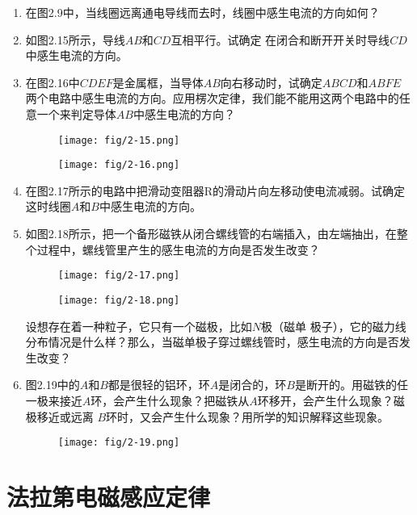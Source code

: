 \begin{enumerate}
    \item 在图2.9中，当线圈远离通电导线而去时，线圈中感生电流的方向如何？
    \item 如图2.15所示，导线$AB$和$CD$互相平行。试确定
    在闭合和断开开关时导线$CD$中感生电流的方向。
  \item 在图2.16中$CDEF$是金属框，当导体$AB$向右移动时，试确定$ABCD$和$ABFE$ 两个电路中感生电流的方向。应用楞次定律，我们能不能用这两个电路中的任意一个来判定导体$AB$中感生电流的方向？
  \begin{figure}[htp]
\centering
\begin{minipage}[t]{0.48\textwidth}
\centering
\texttt{[image: fig/2-15.png]}
\caption{}
\end{minipage}
\begin{minipage}[t]{0.48\textwidth}
\centering
\texttt{[image: fig/2-16.png]}
\caption{}
\end{minipage}
\end{figure}
  \item 在图2.17所示的电路中把滑动变阻器R的滑动片向左移动使电流减弱。试确定这时线圈$A$和$B$中感生电流的方向。
  \item 如图2.18所示，把一个备形磁铁从闭合螺线管的右端插入，由左端抽出，在整个过程中，螺线管里产生的感生电流的方向是否发生改变？
\begin{figure}[htp]\centering
\texttt{[image: fig/2-17.png]}
\caption{}
\end{figure}

\begin{figure}[htp]\centering
\texttt{[image: fig/2-18.png]}
\caption{}
\end{figure}


  设想存在着一种粒子，它只有一个磁极，比如$N$极（磁单
  极子），它的磁力线分布情况是什么样？那么，当磁单极子穿过螺线管时，感生电流的方向是否发生改变？
  \item 图2.19中的$A$和$B$都是很轻的铝环，环$A$是闭合的，环$B$是断开的。用磁铁的任一极来接近$A$环，会产生什么现象？把磁铁从$A$环移开，会产生什么现象？磁极移近或远离
  $B$环时，又会产生什么现象？用所学的知识解释这些现象。
\begin{figure}[htp]\centering
\texttt{[image: fig/2-19.png]}
\caption{}
\end{figure}
\end{enumerate}

\section{法拉第电磁感应定律}

